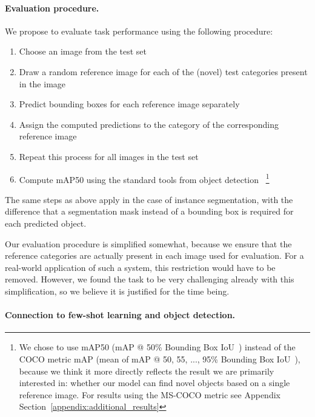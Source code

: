 \documentclass{article}
\newcommand{\coco}{MS-COCO\xspace}
\begin{document}
\paragraph{Evaluation procedure.}

We propose to evaluate task performance using the following procedure:
\begin{enumerate}[nosep]
    \item Choose an image from the test set
    \item Draw a random reference image for each of the (novel) test categories present in the image
    \item Predict bounding boxes for each reference image separately
    \item Assign the computed predictions to the category of the corresponding reference image
    \item Repeat this process for all images in the test set
    \item Compute mAP50 \cite{Everingham2010} using the standard tools from object detection \cite{Coco2018}~\footnote{We chose to use mAP50 (mAP @ 50\% Bounding Box IoU~\cite{Everingham2010}) instead of the COCO metric mAP (mean of mAP @ 50, 55, ..., 95\% Bounding Box IoU~\cite{Lin2014}), because we think it more directly reflects the result we are primarily interested in: whether our model can find novel objects based on a single reference image. For results using the \coco metric see Appendix Section~\ref{appendix:additional_results}}
\end{enumerate}

The same steps as above apply in the case of instance segmentation, with the difference that a segmentation mask instead of a bounding box is required for each predicted object.

Our evaluation procedure is simplified somewhat, because we ensure that the reference categories are actually present in each image used for evaluation. For a real-world application of such a system, this restriction would have to be removed. However, we found the task to be very challenging already with this simplification, so we believe it is justified for the time being.


\paragraph{Connection to few-shot learning and object detection.}
\end{document}
